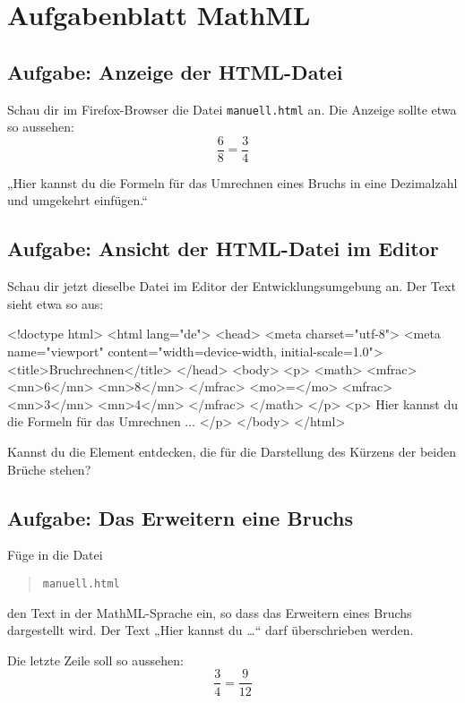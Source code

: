 \section{Aufgabenblatt MathML}

\subsection*{Aufgabe: Anzeige der HTML-Datei}

Schau dir im Firefox-Browser die Datei \texttt{manuell.html} an. Die Anzeige sollte etwa so aussehen:
\[
\frac{6}{8} = \frac{3}{4}
\]

„Hier kannst du die Formeln für das Umrechnen eines Bruchs in eine Dezimalzahl und umgekehrt einfügen.“

\subsection*{Aufgabe: Ansicht der HTML-Datei im Editor}

Schau dir jetzt dieselbe Datei im Editor der Entwicklungsumgebung an. Der Text sieht etwa so aus:

\begin{codeHTML}
<!doctype html>
<html lang="de">
	<head>
		<meta charset="utf-8">
		<meta name="viewport" content="width=device-width, initial-scale=1.0">
		<title>Bruchrechnen</title>
	</head>
	<body>
		<p>
			<math>
				<mfrac>
					<mn>6</mn>
					<mn>8</mn>
				</mfrac>
				<mo>=</mo>
				<mfrac>
					<mn>3</mn>
					<mn>4</mn>
				</mfrac>
			</math>
		</p>
		<p>
 			Hier kannst du die Formeln für das Umrechnen ...
		</p>
	</body>
</html>
\end{codeHTML}

Kannst du die Element entdecken, die für die Darstellung des Kürzens der beiden Brüche stehen?

\subsection*{Aufgabe: Das Erweitern eine Bruchs}

Füge in die Datei
\begin{quote}
\texttt{manuell.html}
\end{quote}
den Text in der MathML-Sprache ein, so dass das Erweitern eines Bruchs dargestellt wird. Der Text „Hier kannst du \dots“ darf überschrieben werden.

Die letzte Zeile soll so aussehen:
\[
\frac{3}{4} = \frac{9}{12}
\]


